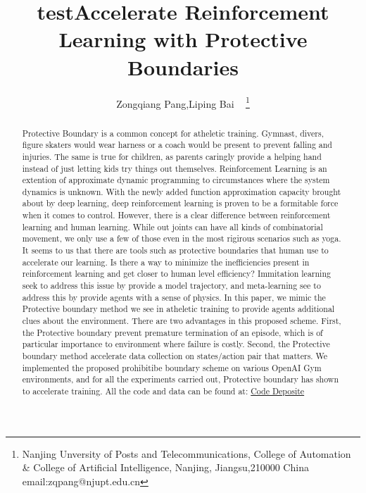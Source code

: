 \documentclass[journal]{IEEEtran}
\begin{document}
    \title{test}
\title{Accelerate Reinforcement Learning with Protective Boundaries}

\author{ Zongqiang Pang,Liping Bai ~ \thanks{Nanjing Unversity of Posts and Telecommunications, College of Automation \& College of Artificial Intelligence, Nanjing, Jiangsu,210000 China email:zqpang@njupt.edu.cn}}
\maketitle
\begin{abstract}
Protective Boundary is a common concept for atheletic training. Gymnast, divers, figure skaters would wear harness or a coach would be present to prevent falling and injuries. The same is true for children, as parents caringly provide a helping hand instead of just letting kids try things out themselves. Reinforcement Learning is an extention of approximate dynamic programming to circumstances where the system dynamics is unknown. With the newly added function approximation capacity brought about by deep learning, deep reinforcement learning is proven to be a formitable force when it comes to control. However, there is a clear difference between reinforcement learning and human learning. While out joints can have all kinds of combinatorial movement, we only use a few of those even in the most rigirous scenarios such as yoga. It seems to us that there are tools such as protective boundaries that human use to accelerate our learning. Is there a way to minimize the inefficiencies present in reinforcement learning and get closer to human level efficiency? Immitation learning seek to address this issue by provide a model trajectory, and meta-learning see to address this by provide agents with a sense of physics. In this paper, we mimic the Protective boundary method we see in atheletic training to provide agents additional clues about the environment. There are two advantages in this proposed scheme. First, the Protective boundary prevent premature termination of an episode, which is of particular importance to environment where failure is costly. Second, the Protective boundary method accelerate data collection on states/action pair that matters. We implemented the proposed prohibitibe boundary scheme on various OpenAI Gym environments, and for all the experiments carried out, Protective boundary has shown to accelerate training. All the code and data can be found at: \href{https://github.com/BaiLiping/ProtectiveBoundary}{Code Deposite}
\end{abstract}
\end{document}
